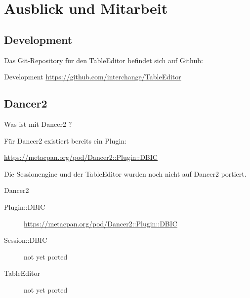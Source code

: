 \section{Ausblick und Mitarbeit}

\subsection{Development}

Das Git-Repository für den TableEditor befindet sich auf Github:

\begin{frame}{Development}
\url{https://github.com/interchange/TableEditor}
\end{frame}

\subsection{Dancer2}

Was ist mit Dancer2 ?

Für Dancer2 existiert bereits ein Plugin:

\url{https://metacpan.org/pod/Dancer2::Plugin::DBIC}

Die Sessionengine und der TableEditor wurden noch nicht auf Dancer2 portiert.

\begin{frame}{Dancer2}
  \begin{description}
  \item[Plugin::DBIC] \url{https://metacpan.org/pod/Dancer2::Plugin::DBIC}
  \item[Session::DBIC] not yet ported
  \item[TableEditor] not yet ported
  \end{description}
\end{frame}






